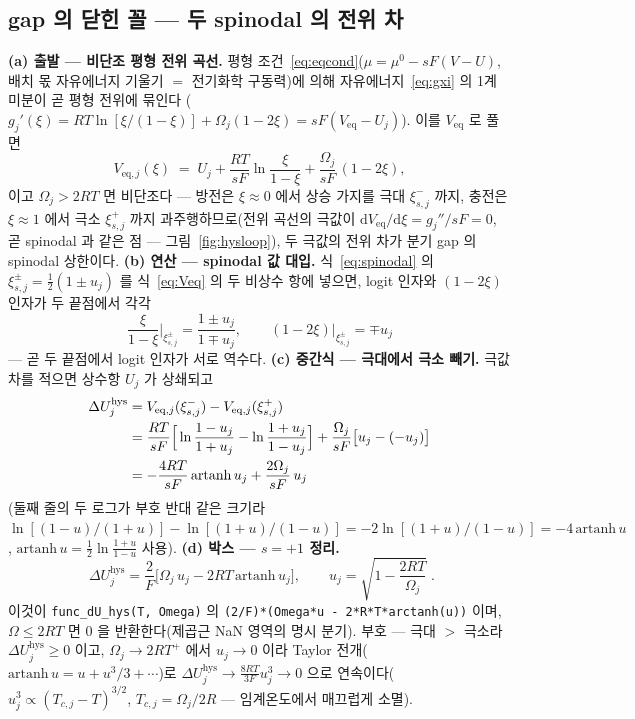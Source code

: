 \documentclass[11pt,a4paper]{article}
\newcommand{\dd}{\mathrm{d}}
\newcommand{\eq}{\mathrm{eq}}
\newcommand{\hys}{\mathrm{hys}}
\newcommand{\code}[1]{\texttt{#1}}
\begin{document}
\subsection{gap 의 닫힌 꼴 — 두 spinodal 의 전위 차}
\textbf{(a) 출발 — 비단조 평형 전위 곡선.} 평형 조건~\eqref{eq:eqcond}($\mu=\mu^0-sF(V-U)$, 배치 몫 자유에너지 기울기 $=$ 전기화학 구동력)에 의해 자유에너지~\eqref{eq:gxi} 의 1계 미분이 곧 평형 전위에 묶인다
($g_j'(\xi)=RT\ln[\xi/(1-\xi)]+\Omega_j(1-2\xi)=sF(V_\eq-U_j)$). 이를 $V_\eq$ 로 풀면
\begin{equation}
V_{\eq,j}(\xi)\;=\;U_j+\frac{RT}{sF}\ln\frac{\xi}{1-\xi}+\frac{\Omega_j}{sF}\,(1-2\xi),
\label{eq:Veq}
\end{equation}
이고 $\Omega_j>2RT$ 면 비단조다 — 방전은 $\xi\!\approx\!0$ 에서 상승 가지를 극대 $\xi_{s,j}^-$ 까지, 충전은 $\xi\!\approx\!1$
에서 극소 $\xi_{s,j}^+$ 까지 과주행하므로(전위 곡선의 극값이 $\dd V_\eq/\dd\xi=g_j''/sF=0$, 곧 spinodal 과 같은 점 —
그림~\ref{fig:hysloop}), 두 극값의 전위 차가 분기 gap 의 spinodal 상한이다. \textbf{(b) 연산 — spinodal 값 대입.}
식~\eqref{eq:spinodal} 의 $\xi_{s,j}^\pm=\tfrac12(1\pm u_j)$ 를 식~\eqref{eq:Veq} 의 두 비상수 항에 넣으면, logit 인자와
$(1-2\xi)$ 인자가 두 끝점에서 각각
\begin{equation}
\frac{\xi}{1-\xi}\bigg|_{\xi_{s,j}^\pm}=\frac{1\pm u_j}{1\mp u_j},
\qquad
(1-2\xi)\big|_{\xi_{s,j}^\pm}=\mp u_j
\label{eq:hyssub}
\end{equation}
— 곧 두 끝점에서 logit 인자가 서로 역수다. \textbf{(c) 중간식 — 극대에서 극소 빼기.} 극값 차를 적으면 상수항 $U_j$ 가
상쇄되고
\begin{align}
\Delta U_j^\hys
&=V_{\eq,j}(\xi_{s,j}^-)-V_{\eq,j}(\xi_{s,j}^+)\notag\\
&=\frac{RT}{sF}\Big[\ln\frac{1-u_j}{1+u_j}-\ln\frac{1+u_j}{1-u_j}\Big]
+\frac{\Omega_j}{sF}\big[u_j-(-u_j)\big]\notag\\
&=-\frac{4RT}{sF}\,\mathrm{artanh}\,u_j+\frac{2\Omega_j}{sF}\,u_j
\label{eq:hysdiff}
\end{align}
(둘째 줄의 두 로그가 부호 반대 같은 크기라 $\ln[(1-u)/(1+u)]-\ln[(1+u)/(1-u)]=-2\ln[(1+u)/(1-u)]=-4\,\mathrm{artanh}\,u$,
$\mathrm{artanh}\,u=\tfrac12\ln\tfrac{1+u}{1-u}$ 사용). \textbf{(d) 박스 — $s=+1$ 정리.}
\begin{equation}
\boxed{\;\Delta U_j^\hys
=\frac{2}{F}\Big[\Omega_j\,u_j-2RT\,\mathrm{artanh}\,u_j\Big],
\qquad u_j=\sqrt{1-\frac{2RT}{\Omega_j}}\;.}
\label{eq:dUhys}
\end{equation}
이것이 \code{func\_dU\_hys(T, Omega)} 의 \code{(2/F)*(Omega*u - 2*R*T*arctanh(u))} 이며, $\Omega\le2RT$ 면 $0$ 을
반환한다(제곱근 NaN 영역의 명시 분기). 부호 — 극대 $>$ 극소라 $\Delta U_j^\hys\ge0$ 이고, $\Omega_j\to2RT^+$ 에서
$u_j\to0$ 이라 Taylor 전개($\mathrm{artanh}\,u=u+u^3/3+\cdots$)로 $\Delta U_j^\hys\to\frac{8RT}{3F}u_j^3\to0$ 으로
연속이다($u_j^3\propto(T_{c,j}-T)^{3/2}$, $T_{c,j}=\Omega_j/2R$ — 임계온도에서 매끄럽게 소멸).
\end{document}
